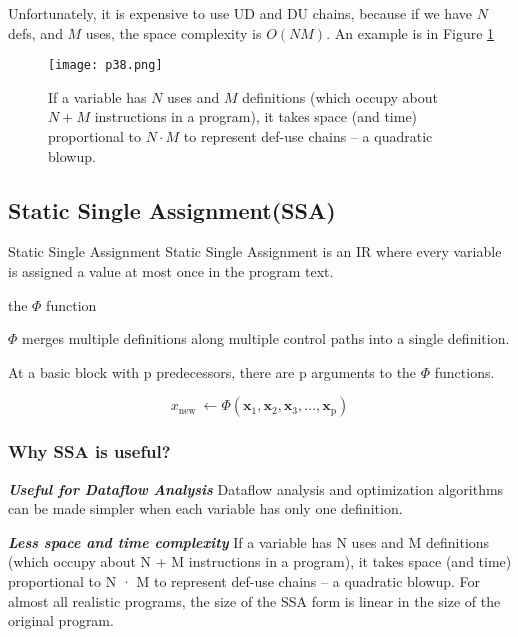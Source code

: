 Unfortunately, it is expensive to use UD and DU chains, because if we have $N$ defs, and $M$ uses,
 the space complexity is $O(NM)$. An example is in Figure \ref{fig:p38}


\begin{figure}[htb]
	\centering
	\texttt{[image: p38.png]}
	\caption{If a variable has $N$ uses and $M$ definitions (which occupy about $N + M$ instructions in a program), it takes space (and time) proportional to $N · M$ to represent def-use chains – a quadratic blowup.}
	\label{fig:p38}
\end{figure}


\subsection{Static Single Assignment(SSA)}

\begin{definition}{Static Single Assignment }
	Static Single Assignment is an IR where every variable is assigned a value at most once in the program text.
\end{definition}








\begin{definition}{the $\Phi$ function}

	$\Phi$ merges multiple definitions along multiple control paths into a single definition.

	At a basic block with p predecessors, there are p arguments to the $\Phi$ functions.

	$$ x_{\text {new }} \leftarrow \Phi\left(\mathbf{x}_1, \mathbf{x}_2, \mathbf{x}_3, \ldots, \mathbf{x}_{\mathrm{p}}\right)
	$$
\end{definition}

\subsubsection{Why SSA is useful?}

\textbf{ \large \textit{Useful for Dataflow Analysis}} Dataflow analysis and optimization algorithms can be made simpler when each variable has only one definition.

\textbf{ \large \textit{Less space and time complexity}} If a variable has N uses and M definitions (which occupy about N + M instructions in a program), it takes space (and time) proportional to N · M to represent def-use chains – a quadratic blowup. For almost all realistic programs, the size of the SSA form is linear in the size of the original program.


